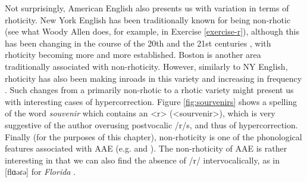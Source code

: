 Not surprisingly, American English also presents us with variation in terms of rhoticity. New York English has been traditionally known for being non-rhotic (see what Woody Allen does, for example, in Exercise \ref{exercise-r}), although this has been changing in the course of the 20th and the 21st centuries \citep{Becker2014}, with rhoticity becoming more and more established. Boston is another area traditionally associated with non-rhoticity. However, similarly to NY English, rhoticity has also been making inroads in this variety and increasing in frequency \citep{Nagy2010}. Such changes from a primarily non-rhotic to a rhotic variety might present us with interesting cases of hypercorrection. Figure \ref{fig:sourvenirs} shows a spelling of the word \textit{souvenir} which contains an <r> (<sourvenir>), which is very suggestive of the author overusing postvocalic /r/s, and thus of hypercorrection. Finally (for the purposes of this chapter), non-rhoticity is one of the phonological features associated with AAE (e.g. \citealp{Becker2014} and \citealp{Thomas2007}). The non-rhoticity of AAE is rather interesting in that we can also find the absence of /r/ intervocalically, as in [flɑəɾə] for \textit{Florida} \citep[454]{Thomas2007}. 


